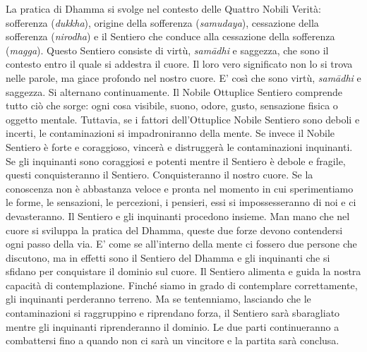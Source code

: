 La pratica di Dhamma si svolge nel contesto delle Quattro Nobili Verità:
sofferenza (\emph{dukkha}), origine della sofferenza (\emph{samudaya}),
cessazione della sofferenza (\emph{nirodha}) e il Sentiero che conduce
alla cessazione della sofferenza (\emph{magga}). Questo Sentiero
consiste di virtù, \emph{samādhi} e saggezza, che sono il contesto entro il
quale si addestra il cuore. Il loro vero significato non lo si trova
nelle parole, ma giace profondo nel nostro cuore. E' così che sono
virtù, \emph{samādhi} e saggezza. Si alternano continuamente. Il Nobile
Ottuplice Sentiero comprende tutto ciò che sorge: ogni cosa visibile,
suono, odore, gusto, sensazione fisica o oggetto mentale. Tuttavia, se i
fattori dell'Ottuplice Nobile Sentiero sono deboli e incerti, le
contaminazioni si impadroniranno della mente. Se invece il Nobile
Sentiero è forte e coraggioso, vincerà e distruggerà le contaminazioni
inquinanti. Se gli inquinanti sono coraggiosi e potenti mentre il
Sentiero è debole e fragile, questi conquisteranno il Sentiero.
Conquisteranno il nostro cuore. Se la conoscenza non è abbastanza veloce
e pronta nel momento in cui sperimentiamo le forme, le sensazioni, le
percezioni, i pensieri, essi si impossesseranno di noi e ci
devasteranno. Il Sentiero e gli inquinanti procedono insieme. Man mano
che nel cuore si sviluppa la pratica del Dhamma, queste due forze devono
contendersi ogni passo della via. E' come se all'interno della mente ci
fossero due persone che discutono, ma in effetti sono il Sentiero del
Dhamma e gli inquinanti che si sfidano per conquistare il dominio sul
cuore. Il Sentiero alimenta e guida la nostra capacità di
contemplazione. Finché siamo in grado di contemplare correttamente, gli
inquinanti perderanno terreno. Ma se tentenniamo, lasciando che le
contaminazioni si raggruppino e riprendano forza, il Sentiero sarà
sbaragliato mentre gli inquinanti riprenderanno il dominio. Le due parti
continueranno a combattersi fino a quando non ci sarà un vincitore e la
partita sarà conclusa.

